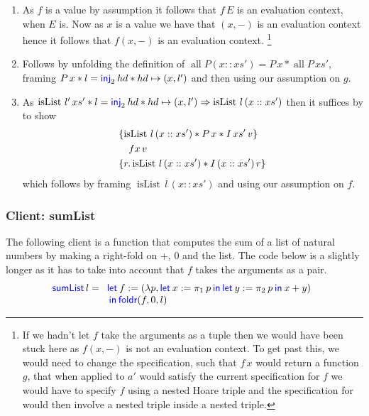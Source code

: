 \begin{enumerate}
\item As $f$ is a value by assumption it follows that $f \, E$ is an evaluation context, when $E$ is.
  Now as $x$ is a value we have that $(x, -)$ is an evaluation context hence it follows that $f (x, - )$ is an evaluation context.%
  \footnote{If we hadn't let $f$ take the arguments as a tuple then we would have been stuck here as $f (x, -)$ is not an evaluation context.
  To get past this, we would need to change the specification, such that $f \, x$ would return a function $g$, that when applied to $a'$ would satisfy the current specification for $f$ \ie{} we would have to specify $f$ using a nested Hoare triple and the specification for  would then involve a nested triple inside a nested triple.}

\item Follows by unfolding the definition of $\operatorname{all} P (x::xs') = P \, x \ast \operatorname{all} P \, xs'$, framing $P \, x \ast l = \textsf{\color{blue} inj}_{2}\nobreak\hskip 0.2em plus 0.1em hd \ast hd \mapsto (x,l')$ and then using our assumption on $g$.

\item As $ \operatorname{isList} \, l' \, xs' \ast l = \textsf{\color{blue} inj}_{2}\nobreak\hskip 0.2em plus 0.1em hd \ast hd \mapsto (x,l') \Rightarrow \operatorname{isList} \, l \, (x::xs') $ then it suffices by  to show
  \begin{align*}
    \hoareV{ \operatorname{isList} \, l \, (x::xs') \ast P\, x \ast I \, xs' \, v  }
    {f x \, v}
    {r. \operatorname{isList} \, l \, (x::xs') \ast I \, (x::xs') \, r}
  \end{align*}
  which follows by framing $\operatorname{isList} \, l \, (x::xs')$ and using our assumption
  on $f$.
\end{enumerate}

\subsubsection*{Client: sumList}
The following client is a function that computes the sum of a list of natural numbers by making a right-fold on +, 0 and the list. The code below is  a slightly longer as it has to take into account that $f$ takes the arguments as a pair. 
\begin{displaymath}
    \langkw{sumList} \, l =
    \begin{array}[t]{l}
    \Let f = (\lambda p, \Let x = \Proj{1} p in \Let y = \Proj{2} p in x + y)\\
   		 in \langkw{foldr}(f, 0, l)
    \end{array}
  \end{displaymath}

